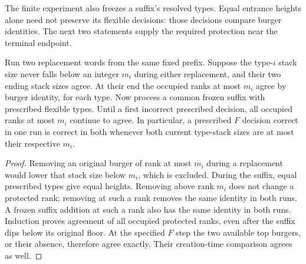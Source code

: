 The finite experiment also freezes a suffix's resolved types. Equal
entrance heights alone need not preserve its flexible decisions: those
decisions compare burger identities. The next two statements supply the
required protection near the terminal endpoint.

\begin{lemma}\label{loc:protected-prefix-stacks}
Run two replacement words from the same fixed prefix.  Suppose the
type-$i$ stack size never falls below an integer $m_i$ during either
replacement, and their two ending stack sizes agree.  At their end the
occupied ranks at most $m_i$ agree by burger identity, for each type.
Now process a common frozen suffix with prescribed flexible types.
Until a first incorrect prescribed decision, all occupied ranks at most
$m_i$ continue to agree.  In particular, a prescribed $F$ decision
correct in one run is correct in both whenever both current type-stack
sizes are at most their respective $m_i$.
\end{lemma}
\begin{proof}
Removing an original burger of rank at most $m_i$ during a replacement
would lower that stack size below $m_i$, which is excluded.  During the
suffix, equal prescribed types give equal heights.  Removing above rank
$m_i$ does not change a protected rank; removing at such a rank removes
the same identity in both runs.  A frozen suffix addition at such a rank
also has the same identity in both runs.  Induction proves agreement of
all occupied protected ranks, even after the suffix dips below its
original floor.  At the specified $F$ step the two available top burgers,
or their absence, therefore agree exactly.  Their creation-time
comparison agrees as well.
\end{proof}

